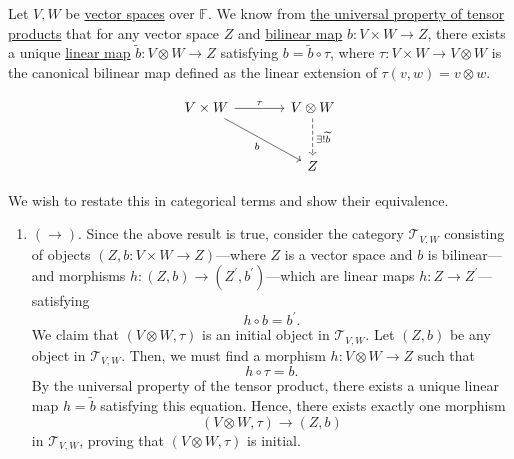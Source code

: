 	\begin{example}
	  \label{ex:tensor-products-as-initial-universal-objects}
		Let $V, W$ be \hyperref[lin-def:vector-space]{vector spaces} over $\mathbb{F}$. We know from \hyperref[lin-thm:universal_tensor]{the universal property of tensor products} that for any vector space $Z$ and \hyperref[lin-def:bilinear-map]{bilinear map} $b: V \times W \to Z$, there exists a unique \hyperref[lin-def:linear_map]{linear map} $\widetilde{b}: V \otimes W \to Z$ satisfying $b = \widetilde{b} \circ \tau$, where $\tau: V \times W \to V \otimes W$ is the canonical bilinear map defined as the linear extension of $\tau(v,w) = v \otimes w$.

		\begin{equation}
			\begin{tikzcd}[column sep=large, row sep=large]
				V \times W \arrow[r, "\tau"] \arrow[dr, "b"'] &
				V \otimes W \arrow[d, dashed, "\exists!\widetilde b"] \\
				& Z
			\end{tikzcd}
		\end{equation}

		We wish to restate this in categorical terms and show their equivalence.
		\begin{enumerate}
			\item $(\rightarrow)$. Since the above result is true, consider the category $\mathcal{T}_{V,W}$ consisting of objects $(Z, b: V \times W \to Z)$---where $Z$ is a vector space and $b$ is bilinear---and morphisms $h: (Z, b) \to (Z^\prime, b^\prime)$---which are linear maps $h: Z \to Z^\prime$---satisfying
				\begin{equation}
					h \circ b = b^\prime.
				\end{equation}
				We claim that $(V \otimes W, \tau)$ is an initial object in $\mathcal{T}_{V,W}$. Let $(Z, b)$ be any object in $\mathcal{T}_{V,W}$. Then, we must find a morphism $h: V \otimes W \to Z$ such that
				\begin{equation}
					h \circ \tau = b.
				\end{equation}
				By the universal property of the tensor product, there exists a unique linear map $h = \widetilde{b}$ satisfying this equation. Hence, there exists exactly one morphism
				\begin{equation}
					(V \otimes W, \tau) \to (Z, b)
				\end{equation}
				in $\mathcal{T}_{V,W}$, proving that $(V \otimes W, \tau)$ is initial.


\end{enumerate}
\end{example}
